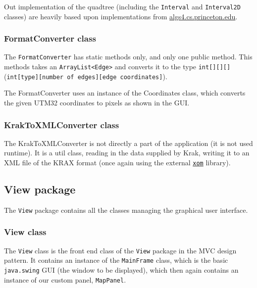 \documentclass[a4paper,11pt]{article}
\begin{document}
Out implementation of the quadtree (including the \texttt{Interval} and \texttt{Interval2D} classes) are heavily based upon implementations from
\url{algs4.cs.princeton.edu}.


\subsubsection{FormatConverter class} %
The \texttt{FormatConverter} has static methods only, and only one public method. This methods takes an \texttt{ArrayList<Edge>} and converts it to the type \texttt{int[][][]} (\texttt{int[type][number of edges][edge coordinates]}).

The FormatConverter uses an instance of the Coordinates class, which converts the given UTM32 coordinates to pixels as shown in the GUI.

\subsubsection{KrakToXMLConverter class} %
The KrakToXMLConverter is not directly a part of the application (it is not used runtime). It is a util class, reading in the data supplied by Krak, writing it to an XML file of the KRAX format (once again using the external \href{www.xom.nu}{\texttt{xom}} library).

\subsection{View package} %
The \texttt{View} package contains all the classes managing the graphical user interface.

\subsubsection{View class} %
The \texttt{View} class is the front end class of the \texttt{View} package in the MVC design pattern. It contains an instance of the \texttt{MainFrame} class, which is the basic \texttt{java.swing} GUI (the window to be displayed), which then again contains an instance of our custom panel, \texttt{MapPanel}.
\end{document}
